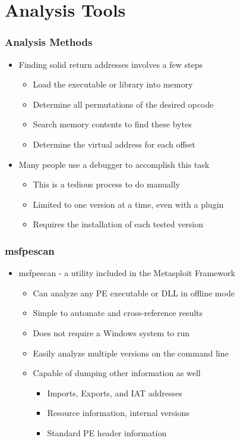 \documentclass{beamer}
\newenvironment{sitemize}{\vspace{1mm}\begin{itemize}\itemsep 4pt\small}{\end{itemize}}
\begin{document}
\section{Analysis Tools}
\begin{frame}[t]
	\frametitle{Analysis Methods}
	\begin{sitemize}
		\item Finding solid return addresses involves a few steps
		\begin{sitemize}
			\item Load the executable or library into memory
			\item Determine all permutations of the desired opcode
			\item Search memory contents to find these bytes
			\item Determine the virtual address for each offset
		\end{sitemize}		
	\end{sitemize}
	
	\pause
	\begin{sitemize}
		\item Many people use a debugger to accomplish this task
		\begin{sitemize}
			\item This is a tedious process to do manually
			\item Limited to one version at a time, even with a plugin
			\item Requires the installation of each tested version
		\end{sitemize}
	\end{sitemize}	
\end{frame}

\begin{frame}[t]
	\frametitle{msfpescan}
	\begin{sitemize}
		\item msfpescan - a utility included in the Metasploit Framework
		\begin{sitemize}
			\item Can analyze any PE executable or DLL in offline mode
			\item Simple to automate and cross-reference results
			\item Does not require a Windows system to run
			\item Easily analyze multiple versions on the command line
			\item Capable of dumping other information as well
			\begin{sitemize}
				\item Imports, Exports, and IAT addresses
				\item Resource information, internal versions
				\item Standard PE header information
			\end{sitemize}
		\end{sitemize}		
	\end{sitemize}
\end{frame}
\end{document}
